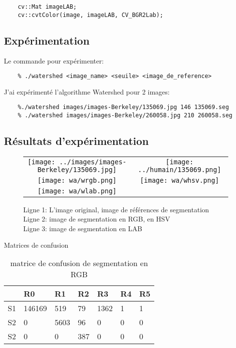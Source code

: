 \documentclass[article=a4, fontsize=11pt]{scrartcl}	%
\begin{document}
\begin{lstlisting}
    cv::Mat imageLAB;
    cv::cvtColor(image, imageLAB, CV_BGR2Lab);
\end{lstlisting}
\subsection{Expérimentation}
Le commande pour expérimenter:
\begin{lstlisting}
    % ./watershed <image_name> <seuile> <image_de_reference>
\end{lstlisting}
J'ai expérimenté l'algorithme Watershed pour 2 images:
\begin{lstlisting}
    %./watershed images/images-Berkeley/135069.jpg 146 135069.seg
    % ./watershed images/images-Berkeley/260058.jpg 210 260058.seg
\end{lstlisting}
\subsection{Résultats d'expérimentation}
\clearpage
\begin{figure}[!ht]
	\begin{center}
		\begin{tabular}[h]{cc}
			\texttt{[image: ../images/images-Berkeley/135069.jpg]}&
			\texttt{[image: ../humain/135069.png]}\\
						
			\texttt{[image: wa/wrgb.png]}&
			\texttt{[image: wa/whsv.png]}\\
			\texttt{[image: wa/wlab.png]}& 
		\end{tabular}
	\end{center}
	\caption{Ligne 1: L'image original, image de références de segmentation\\
			 Ligne 2: image de segmentation en RGB, en HSV \\
			 Ligne 3: image de segmentation en LAB}	
\end{figure}
\clearpage
\Huge{Matrices de confusion}\normalsize
\begin{table}[!ht]
	\begin{center}
	    \begin{tabular}{| l | l | l | l | l | l | l |}
	    	\hline
	    	  & R0 & R1 & R2 & R3 & R4 & R5\\
	    	\hline
	    	S1 & 146169 & 519 & 79 & 1362 & 1 & 1\\
	    	\hline
	    	S2 & 0 & 5603 & 96 & 0 & 0 & 0\\
	    	\hline
	    	S2 & 0 & 0 & 387 & 0 & 0 & 0\\
	    	\hline	    	
	    \end{tabular}
	\end{center}
	\caption {matrice de confusion de segmentation en RGB}
\end{table}
\end{document}
